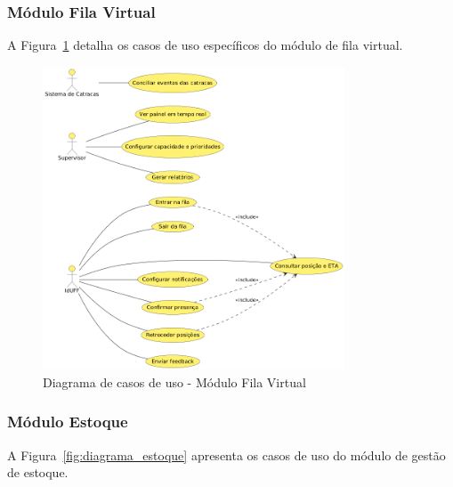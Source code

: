 \documentclass[12pt,a4paper]{article}
\begin{document}
\subsubsection{Módulo Fila Virtual}
A Figura~\ref{fig:diagrama_fila} detalha os casos de uso específicos do módulo de fila virtual.

\begin{figure}[H]
    \centering
    \includegraphics[width=0.8\textwidth]{diagramas/diagrama-fila.png}
    \caption{Diagrama de casos de uso - Módulo Fila Virtual}
    \label{fig:diagrama_fila}
\end{figure}

\subsubsection{Módulo Estoque}
A Figura~\ref{fig:diagrama_estoque} apresenta os casos de uso do módulo de gestão de estoque.
\end{document}
